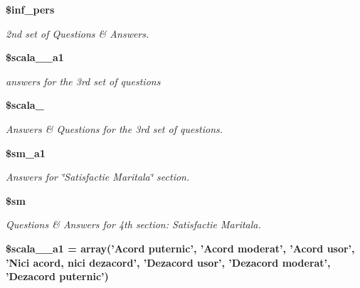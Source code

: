 \begin{CompactItemize}
\item 
\bf{\$inf\_\-pers}\label{d1/d7c/a00003_5aa278262dd31ae338e3a8484e8c721c}

\begin{CompactList}\small\item\em 2nd set of Questions \& Answers. \item\end{CompactList}\item 
\bf{\$scala\_\_\-a1}
\begin{CompactList}\small\item\em answers for the 3rd set of questions \item\end{CompactList}\item 
\bf{\$scala\_}
\begin{CompactList}\small\item\em Answers \& Questions for the 3rd set of questions. \item\end{CompactList}\item 
\bf{\$sm\_\-a1}
\begin{CompactList}\small\item\em Answers for \char`\"{}Satisfactie Maritala\char`\"{} section. \item\end{CompactList}\item 
\bf{\$sm}
\begin{CompactList}\small\item\em Questions \& Answers for 4th section: Satisfactie Maritala. \item\end{CompactList}\item 
\bf{\$scala\_\_\-a1} = array('Acord puternic', 'Acord moderat', 'Acord usor', 'Nici acord, nici dezacord', 'Dezacord usor', 'Dezacord moderat', 'Dezacord puternic')\label{d1/d7c/a00003_e2206d04dd987bcb6c7429c6eb7d7bbf}


\end{CompactItemize}
